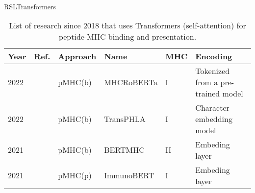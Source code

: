 \documentclass[10pt]{beamer}
\newcommand{\1}{
	\setbeamertemplate{background}{
		\texttt{[image: img/1]}
		\tikz[overlay] \fill[fill opacity=0.75,fill=white] (0,0) rectangle (-\paperwidth,\paperheight);
	}
}
\begin{document}
\begin{frame}{RSL}{Transformers}
	
	\fontsize{8pt}{5pt}\selectfont
	
	\begin{table}[]
		\centering
		\caption{List of research since 2018 that uses Transformers (self-attention) for peptide-MHC binding and presentation.}		
		\setlength{\tabcolsep}{0.5em} %
		{\renewcommand{\arraystretch}{2}%
			\begin{tabular}{p{0.6cm}p{0.6cm}p{1.5cm}p{2cm}p{0.6cm}p{2.7cm}}
				\textbf{Year} & \textbf{Ref.}                                  & \textbf{Approach}        & \textbf{Name} & \textbf{MHC} & \textbf{Encoding}                                                                                                                                                                                                         \\ \hline
				2022          & \cite{wang2022mhcroberta}     & pMHC(b)      & MHCRoBERTa    & I        & Tokenized from a pre-trained model               \\
				2022          & \cite{chu2022transformer}     & pMHC(b)      & TransPHLA     & I        & Character embedding model           \\
				2021          & \cite{cheng2021bertmhc}       & pMHC(b)      & BERTMHC       & II       & Embeding layer                           \\
				2021          & \cite{gasser2021interpreting} & pMHC(p) & ImmunoBERT    & I        & Embeding layer             
			\end{tabular}
		}
	\end{table}	
\end{frame}
\end{document}
